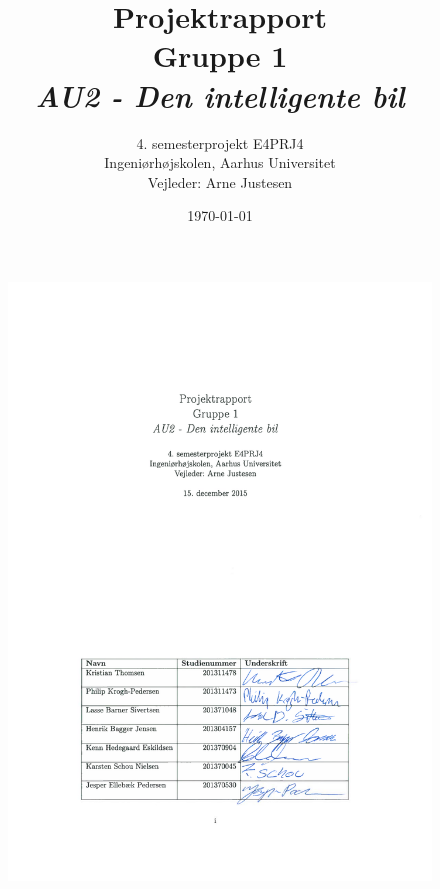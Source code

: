 \documentclass[a4paper,11pt,twoside,article]{memoir}
\title{Projektrapport \\ Gruppe 1 \\ \textit{AU2 - Den intelligente bil }}
\author{4. semesterprojekt E4PRJ4 \\ Ingeniørhøjskolen, Aarhus Universitet\\ Vejleder: Arne Justesen}
\date{\today}
\begin{document}
\fancyhf{}
\frontmatter
\maketitle
\vfill

\begin{figure}
\centering
\includegraphics[scale=1, trim=90 100 90 450, clip=true]{../fig/forside_rapport_underskrevet}
\end{figure}
\end{document}
